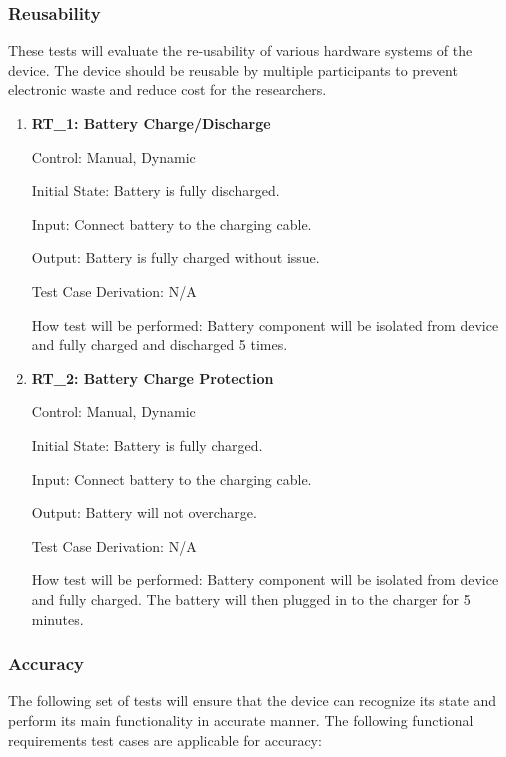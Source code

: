 \documentclass[12pt, titlepage]{article}
\begin{document}
\subsubsection{Reusability}

These tests will evaluate the re-usability of various hardware systems of the device. The device should be reusable by multiple participants to prevent electronic waste and reduce cost for the researchers. 

\begin{enumerate}


\item{\textbf{RT\_1: Battery Charge/Discharge}}\label{RT1}

Control: Manual, Dynamic

Initial State: Battery is fully discharged.

Input: Connect battery to the charging cable.

Output: Battery is fully charged without issue.

Test Case Derivation: N/A

How test will be performed: Battery component will be isolated from device and fully charged and discharged 5 times.

\item{\textbf{RT\_2: Battery Charge Protection}}\label{RT2}

Control: Manual, Dynamic

Initial State: Battery is fully charged.

Input: Connect battery to the charging cable.

Output: Battery will not overcharge.

Test Case Derivation: N/A

How test will be performed: Battery component will be isolated from device and fully charged. The battery will then plugged in to the charger for 5 minutes.

\end{enumerate}

\subsubsection{Accuracy}
The following set of tests will ensure that the device can recognize its state and perform its main functionality in accurate manner.
The following functional requirements test cases are applicable for accuracy:
\end{document}
